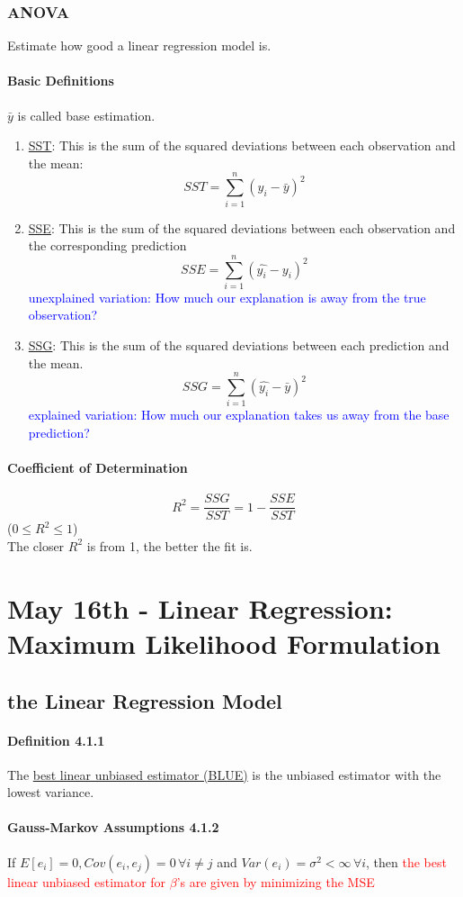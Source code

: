 \documentclass[11pt]{article}
\newcommand{\under}[1]{\underline{#1}}
\begin{document}
\subsubsection{ANOVA}
Estimate how good a linear regression model is.
\paragraph{Basic Definitions}
$\bar{y}$ is called base estimation.
\begin{enumerate}
	\item \under{SST}: This is the sum of the squared deviations between each observation and the mean:
	$$SST = \sum_{i=1}^n(y_{i}-\bar{y})^2$$
	\item \under{SSE}: This is the sum of the squared deviations between each observation and the corresponding prediction
	$$SSE = \sum_{i=1}^n(\hat{y_i} - y_i)^2$$
	\textcolor{blue}{unexplained variation: How much our explanation is away from the true observation?}
	\item \under{SSG}: This is the sum of the squared deviations between each prediction and the mean.
	$$SSG = \sum_{i=1}^n(\hat{y_i}-\bar{y})^2$$
	\textcolor{blue}{explained variation: How much our explanation takes us away from the base prediction?}
\end{enumerate}
\paragraph{Coefficient of Determination}
$$R^2 = \frac{SSG}{SST} = 1- \frac{SSE}{SST}$$
($0 \leq R^2 \leq 1$)\\
The closer $R^2$ is from 1, the better the fit is.
\section{May 16th - Linear Regression: Maximum Likelihood Formulation}
\subsection{the Linear Regression Model}
\paragraph{Definition 4.1.1}
The \under{best linear unbiased estimator (BLUE)} is the unbiased estimator with the lowest variance.
\paragraph{Gauss-Markov Assumptions 4.1.2}
If $E[e_i] = 0, Cov(e_i, e_j) = 0 \, \forall i \neq j$ and $Var(e_i) = \sigma^2 < \infty \, \forall i$, then \textcolor{red}{the best linear unbiased estimator for $\beta$'s are given by minimizing the MSE}
\end{document}
